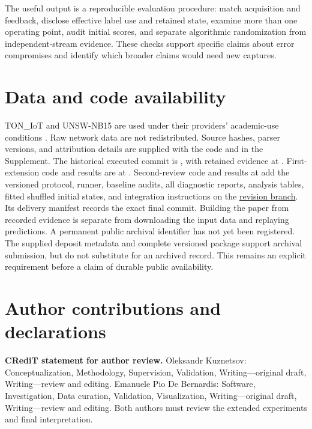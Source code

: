 The useful output is a reproducible evaluation procedure: match acquisition and feedback, disclose effective label use and retained state, examine more than one operating point, audit initial scores, and separate algorithmic randomization from independent-stream evidence. These checks support specific claims about error compromises and identify which broader claims would need new captures.

\section*{Data and code availability}
TON\_IoT and UNSW-NB15 are used under their providers' academic-use conditions \citep{toniotweb,unswweb}. Raw network data are not redistributed. Source hashes, parser versions, and attribution details are supplied with the code and in the Supplement. The historical executed commit is , with retained evidence at . First-extension code and results are at \href{https://github.com/KuznetsovKarazin/kan-ids-v2/commit/54871f0f36b22a69fe9a114a617d957b896da7b1}{}. Second-review code and results at \href{https://github.com/KuznetsovKarazin/kan-ids-v2/commit/dd9e0ea8bb2d8c9d8283e752e8a059b104291390}{} add the versioned protocol, runner, baseline audits, all diagnostic reports, analysis tables, fitted shuffled initial states, and integration instructions on the \href{https://github.com/KuznetsovKarazin/kan-ids-v2/tree/paper2/review-extension-20261101/adattamento-drift/review_extension}{revision branch}. Its delivery manifest records the exact final commit. Building the paper from recorded evidence is separate from downloading the input data and replaying predictions. A permanent public archival identifier has not yet been registered. The supplied deposit metadata and complete versioned package support archival submission, but do not substitute for an archived record. This remains an explicit requirement before a claim of durable public availability.

\section*{Author contributions and declarations}
\noindent\textbf{CRediT statement for author review.} Oleksandr Kuznetsov: Conceptualization, Methodology, Supervision, Validation, Writing---original draft, Writing---review and editing. Emanuele Pio De Bernardis: Software, Investigation, Data curation, Validation, Visualization, Writing---original draft, Writing---review and editing. Both authors must review the extended experiments and final interpretation.

